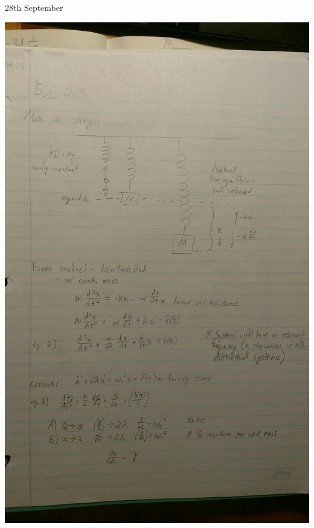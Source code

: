\documentclass[11pt]{article}
\theoremstyle{definition}
\begin{document}
\begin{center}
    {\LARGE 28th September}\\
\end{center}
\includegraphics[width=\textwidth,height=\textheight,keepaspectratio]{friday/1.jpg}\\
\end{document}
